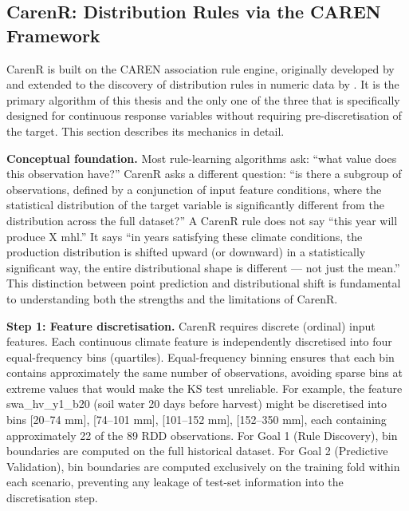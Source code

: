 \subsection{CarenR: Distribution Rules via the CAREN Framework}\label{sub:carenr_distribution_rules_via}

CarenR is built on the CAREN association rule engine, originally developed by \citet{Azevedo2003} and extended to the discovery of distribution rules in numeric data by \citet{Jorge2006}. It is the primary algorithm of this thesis and the only one of the three that is specifically designed for continuous response variables without requiring pre-discretisation of the target. This section describes its mechanics in detail.

\textbf{Conceptual foundation. }Most rule-learning algorithms ask: ``what value does this observation have?'' CarenR asks a different question: ``is there a subgroup of observations, defined by a conjunction of input feature conditions, where the statistical distribution of the target variable is significantly different from the distribution across the full dataset?'' A CarenR rule does not say ``this year will produce X mhl.'' It says ``in years satisfying these climate conditions, the production distribution is shifted upward (or downward) in a statistically significant way, the entire distributional shape is different --- not just the mean.'' This distinction between point prediction and distributional shift is fundamental to understanding both the strengths and the limitations of CarenR.

\textbf{Step 1: Feature discretisation. }CarenR requires discrete (ordinal) input features. Each continuous climate feature is independently discretised into four equal-frequency bins (quartiles). Equal-frequency binning ensures that each bin contains approximately the same number of observations, avoiding sparse bins at extreme values that would make the KS test unreliable. For example, the feature swa\_hv\_y1\_b20 (soil water 20 days before harvest) might be discretised into bins [20--74 mm], [74--101 mm], [101--152 mm], [152--350 mm], each containing approximately 22 of the 89 RDD observations. For Goal 1 (Rule Discovery), bin boundaries are computed on the full historical dataset. For Goal 2 (Predictive Validation), bin boundaries are computed exclusively on the training fold within each scenario, preventing any leakage of test-set information into the discretisation step.

